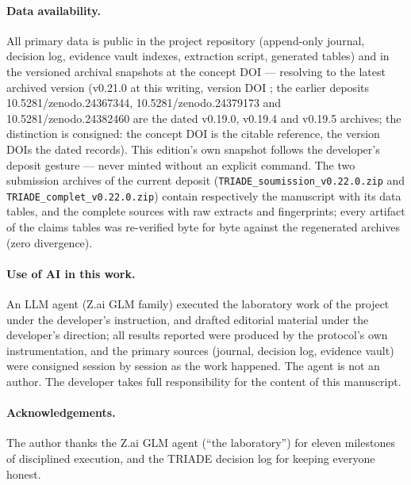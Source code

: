 \documentclass[11pt,a4paper]{article}
\newcommand{\code}[1]{\texttt{\small #1}}
\begin{document}
\paragraph{Data availability.} All primary data is public in the project
repository (append-only journal, decision log, evidence vault indexes,
extraction script, generated tables) and in the versioned archival
snapshots at the concept DOI \doiConcept{} --- resolving to the latest
archived version (v0.21.0 at this writing, version DOI
\doiVersionCourante{}; the earlier deposits 10.5281/zenodo.24367344,
10.5281/zenodo.24379173 and 10.5281/zenodo.24382460 are the dated
v0.19.0, v0.19.4 and v0.19.5 archives; the distinction is consigned:
the concept DOI is the citable reference, the version DOIs the dated
records). This edition's own snapshot follows the developer's deposit
gesture --- never minted without an explicit command. The two
submission archives of the current deposit
(\code{TRIADE\_soumission\_v0.22.0.zip} and
\code{TRIADE\_complet\_v0.22.0.zip}) contain respectively the
manuscript with its data tables, and the complete sources with raw
extracts and fingerprints; every artifact of the claims tables was
re-verified byte for byte against the regenerated archives (zero
divergence).

\paragraph{Use of AI in this work.} An LLM agent (Z.ai GLM family)
executed the laboratory work of the project under the developer's
instruction, and drafted editorial material under the developer's
direction; all results reported were produced by the protocol's own
instrumentation, and the primary sources (journal, decision log,
evidence vault) were consigned session by session as the work happened.
The agent is not an author. The developer takes full responsibility for
the content of this manuscript.

\paragraph{Acknowledgements.} The author thanks the Z.ai GLM agent
(``the laboratory'') for eleven milestones of disciplined execution, and
the TRIADE decision log for keeping everyone honest.


\end{document}
